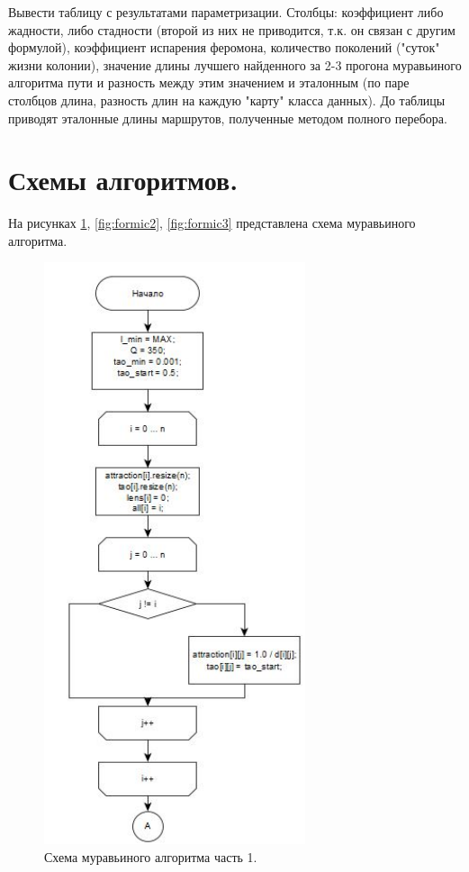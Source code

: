 \documentclass[a4paper,oneside,14pt]{extreport}
\begin{document}
Вывести таблицу с результатами параметризации. Столбцы: коэффициент либо жадности, либо стадности (второй из них не приводится, т.к. он связан с другим формулой), коэффициент испарения феромона, количество поколений ("суток" жизни колонии), значение длины лучшего найденного за 2-3 прогона муравьиного алгоритма пути и разность между этим значением и эталонным (по паре столбцов длина, разность длин на каждую "карту" класса данных). До таблицы приводят эталонные длины маршрутов, полученные методом полного перебора.

\section{Схемы алгоритмов.}

На рисунках \ref{fig:formic1}, \ref{fig:formic2}, \ref{fig:formic3} представлена схема муравьиного алгоритма.

\begin{figure}[H]
	\begin{center}
		\includegraphics[scale=1]{images/formic.png}
		\caption{Схема муравьиного алгоритма часть 1.}
		\label{fig:formic1}
	\end{center}
\end{figure}
\end{document}
